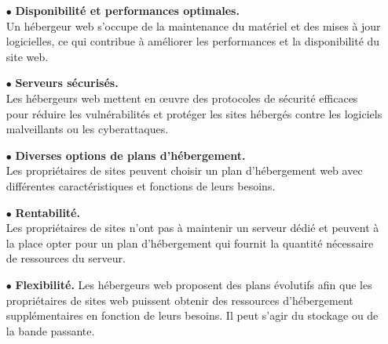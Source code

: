 \begin{enumerate}
	
	\item[$\bullet$]\textbf{Disponibilité et performances optimales.\\} Un hébergeur web s’occupe de la maintenance du matériel et des mises à jour logicielles, ce qui contribue à améliorer les performances et la disponibilité du site web.
 	\item [$\bullet$]\textbf{Serveurs sécurisés.\\} Les hébergeurs web mettent en œuvre des protocoles de sécurité efficaces pour réduire les vulnérabilités et protéger les sites hébergés contre les logiciels malveillants ou les cyberattaques.
	\item[$\bullet$]\textbf{Diverses options de plans d’hébergement.\\} Les propriétaires de sites peuvent choisir un plan d’hébergement web avec différentes caractéristiques et fonctions de leurs besoins.
	\item[$\bullet$] \textbf{Rentabilité.\\} Les propriétaires de sites n’ont pas à maintenir un serveur dédié et peuvent à la place opter pour un plan d’hébergement qui fournit la quantité nécessaire de ressources du serveur.
	\item [$\bullet$]\textbf{Flexibilité.} Les hébergeurs web proposent des plans évolutifs afin que les propriétaires de sites web puissent obtenir des ressources d’hébergement supplémentaires en fonction de leurs besoins. Il peut s’agir du stockage ou de la bande passante.
\end{enumerate}
